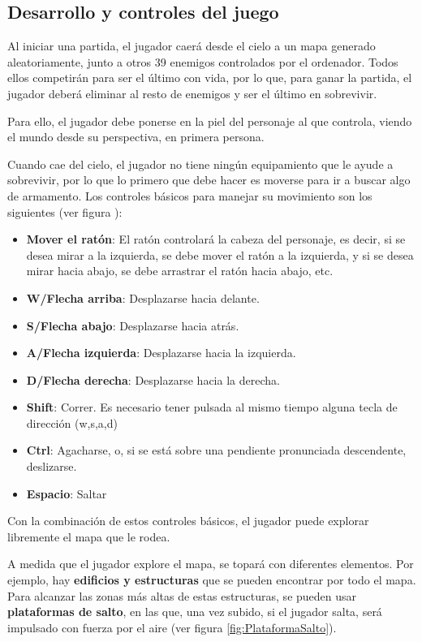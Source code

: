 \subsection{Desarrollo y controles del juego}
Al iniciar una partida, el jugador caerá desde el cielo a un mapa generado aleatoriamente, junto a otros 39 enemigos controlados por el ordenador. Todos ellos competirán para ser el último con vida, por lo que, para ganar la partida, el jugador deberá eliminar al resto de enemigos y ser el último en sobrevivir.

Para ello, el jugador debe ponerse en la piel del personaje al que controla, viendo el mundo desde su perspectiva, en primera persona.

Cuando cae del cielo, el jugador no tiene ningún equipamiento que le ayude a sobrevivir, por lo que lo primero que debe hacer es moverse para ir a buscar algo de armamento. Los controles básicos para manejar su movimiento son los siguientes (ver figura ):
\begin{itemize}
    \item \textbf{Mover el ratón}: El ratón controlará la cabeza del personaje, es decir, si se desea mirar a la izquierda, se debe mover el ratón a la izquierda, y si se desea mirar hacia abajo, se debe arrastrar el ratón hacia abajo, etc.
    \item \textbf{W/Flecha arriba}: Desplazarse hacia delante.
    \item \textbf{S/Flecha abajo}: Desplazarse hacia atrás.
    \item \textbf{A/Flecha izquierda}: Desplazarse hacia la izquierda.
    \item \textbf{D/Flecha derecha}: Desplazarse hacia la derecha.
    \item \textbf{Shift}: Correr. Es necesario tener pulsada al mismo tiempo alguna tecla de dirección (w,s,a,d)
    \item \textbf{Ctrl}: Agacharse, o, si se está sobre una pendiente pronunciada descendente, deslizarse.
    \item \textbf{Espacio}: Saltar
\end{itemize}
Con la combinación de estos controles básicos, el jugador puede explorar libremente el mapa que le rodea.

A medida que el jugador explore el mapa, se topará con diferentes elementos. Por ejemplo, hay \textbf{edificios y estructuras} que se pueden encontrar por todo el mapa. Para alcanzar las zonas más altas de estas estructuras, se pueden usar \textbf{plataformas de salto}, en las que, una vez subido, si el jugador salta, será impulsado con fuerza por el aire (ver figura \ref{fig:PlataformaSalto}).

